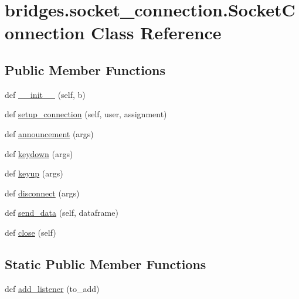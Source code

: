 \hypertarget{classbridges_1_1socket__connection_1_1_socket_connection}{}\section{bridges.\+socket\+\_\+connection.\+Socket\+Connection Class Reference}
\label{classbridges_1_1socket__connection_1_1_socket_connection}
\subsection*{Public Member Functions}
\begin{DoxyCompactItemize}
\item 
def \mbox{\hyperlink{classbridges_1_1socket__connection_1_1_socket_connection_ae241a5233f4cb8ad07e9a716ebfa3e55}{\+\_\+\+\_\+init\+\_\+\+\_\+}} (self, b)
\item 
def \mbox{\hyperlink{classbridges_1_1socket__connection_1_1_socket_connection_a346d70ef1084f4387df0f3027ac0f527}{setup\+\_\+connection}} (self, user, assignment)
\item 
def \mbox{\hyperlink{classbridges_1_1socket__connection_1_1_socket_connection_ad2dbfe3f51475790ed1f03dc945168f1}{announcement}} (args)
\item 
def \mbox{\hyperlink{classbridges_1_1socket__connection_1_1_socket_connection_a6acd8ac3ac9d055de1ba086b447fbe7f}{keydown}} (args)
\item 
def \mbox{\hyperlink{classbridges_1_1socket__connection_1_1_socket_connection_a4ee952f67b32414fba663d5e9c53bf14}{keyup}} (args)
\item 
def \mbox{\hyperlink{classbridges_1_1socket__connection_1_1_socket_connection_a50b0181494d99f9a33bf7fb75c100842}{disconnect}} (args)
\item 
def \mbox{\hyperlink{classbridges_1_1socket__connection_1_1_socket_connection_a6f120b756e07aab0742ed42466984b31}{send\+\_\+data}} (self, dataframe)
\item 
def \mbox{\hyperlink{classbridges_1_1socket__connection_1_1_socket_connection_a38dd36c5ac674016d526e8cd2c515ac4}{close}} (self)
\end{DoxyCompactItemize}
\subsection*{Static Public Member Functions}
\begin{DoxyCompactItemize}
\item 
def \mbox{\hyperlink{classbridges_1_1socket__connection_1_1_socket_connection_a21d94eb97d7ea92e38dc8e78f1e40876}{add\+\_\+listener}} (to\+\_\+add)
\end{DoxyCompactItemize}
